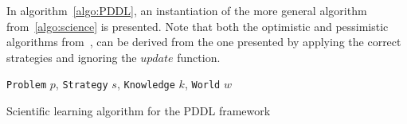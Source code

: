 \documentclass[../Master.tex]{subfiles}
\begin{document}
In algorithm~\ref{algo:PDDL}, an instantiation of the more general algorithm from~\ref{algo:science} is presented. Note that both the optimistic and pessimistic algorithms from~\cite{Walsh2008}, can be derived from the one presented by applying the correct strategies and ignoring the $update$ function. 

\begin{algorithm}
    \begin{algorithmic}
         {\texttt{Problem} $p$, \texttt{Strategy} $s$, \texttt{Knowledge} $k$, \texttt{World} $w$}
                \Else%
                    \EndFor%
                \EndIf%
            \EndWhile%
        \EndFunction%
    \end{algorithmic}
    \caption{Scientific learning algorithm for the PDDL framework}\label{algo:PDDL}
\end{algorithm}
\end{document}
